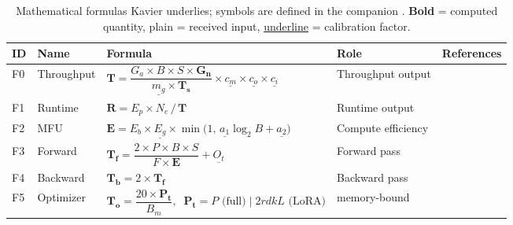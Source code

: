 
\begin{table}[!h]
  \centering
  \caption{\footnotesize{Mathematical formulas Kavier underlies; symbols are defined in the companion . \textbf{Bold} = computed quantity,
  plain = received input, \underline{underline} = calibration factor.}}
  \label{tab:kavier-formulas}
  \renewcommand{\arraystretch}{1.5}
  \footnotesize
  \begin{tabular}{@{}l l l l l@{}}
  \toprule
  \textbf{ID} & \textbf{Name} & \textbf{Formula} & \textbf{Role} & \textbf{References} \\
  \midrule
  F0 & Throughput     & $\boldsymbol{T} = \dfrac{G_a \times B \times S \times \boldsymbol{G_n}}{\underline{m_g} \times \boldsymbol{T_s}} \times \underline{c_m} \times
  \underline{c_o} \times \underline{c_i}$ & Throughput output   & \cite{nicolae2025kavier, DBLP:conf/sc/NarayananSCLPKV21} \\ \midrule
  \addlinespace[2pt]
  F1 & Runtime        & $\boldsymbol{R} = E_p \times N_e \,/\, \boldsymbol{T}$                                                       & Runtime output      &
  \cite{nicolae2025kavier} \\ \midrule
  \addlinespace[3pt]
  F2 & MFU            & $\boldsymbol{E} = E_b \times \underline{E_g} \times \min\!\bigl(1,\, \underline{a_1} \log_2 B + \underline{a_2}\bigr)$
   & Compute efficiency  & \cite{DBLP:journals/jmlr/ChowdheryNDBMRBCSGSSTMRBTSPRDHPBAI23, DBLP:journals/corr/abs-2204-02311, DBLP:journals/cacm/WilliamsWP09,
  nicolae2025kavier} \\ \midrule
  \addlinespace[3pt]
  F3 & Forward        & $\boldsymbol{T_f} = \dfrac{2 \times P \times B \times S}{F \times \boldsymbol{E}} + \underline{O_t}$                                   &
  Forward pass       & \cite{DBLP:journals/corr/abs-1909-08053, DBLP:journals/corr/abs-2204-02311, DBLP:conf/sc/NarayananSCLPKV21} \\ \midrule
  \addlinespace[3pt]
  F4 & Backward       & $\boldsymbol{T_b} = 2 \times \boldsymbol{T_f}$                                                                            & Backward pass
  & \cite{DBLP:journals/corr/abs-1909-08053, DBLP:conf/sc/NarayananSCLPKV21} \\ \midrule
  \addlinespace[3pt]
  F5 & Optimizer      & $\boldsymbol{T_o} = \dfrac{20 \times \boldsymbol{P_t}}{B_m}, \;\; \boldsymbol{P_t} = P \text{ (full)} \;|\; 2 r d k L \text{ (LoRA)}$   &
  memory-bound        & \cite{DBLP:conf/sc/RajbhandariRRH20, DBLP:conf/iclr/LoshchilovH19, DBLP:conf/iclr/HuSWALWWC22, DBLP:conf/nips/DettmersPHZ23} \\ \midrule

\end{tabular}
\end{table}
